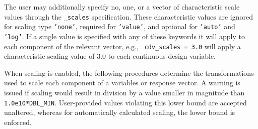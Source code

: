 The user may additionally specify no, one, or a vector of
characteristic scale values through the {\tt *\_scales} specification.
These characteristic values are ignored for scaling type {\tt 'none'},
required for {\tt 'value'}, and optional for {\tt 'auto'} and {\tt
'log'}. If a single value is specified with any of these keywords it
will apply to each component of the relevant vector, e.g., {\tt
cdv\_scales = 3.0} will apply a characteristic scaling value of 3.0 to
each continuous design variable.

When scaling is enabled, the following procedures determine the
transformations used to scale each component of a variables or
response vector. A warning is issued if scaling would result in
division by a value smaller in magnitude than {\tt 1.0e10*DBL\_MIN}.
User-provided values violating this lower bound are accepted
unaltered, whereas for automatically calculated scaling, the lower
bound is enforced.


